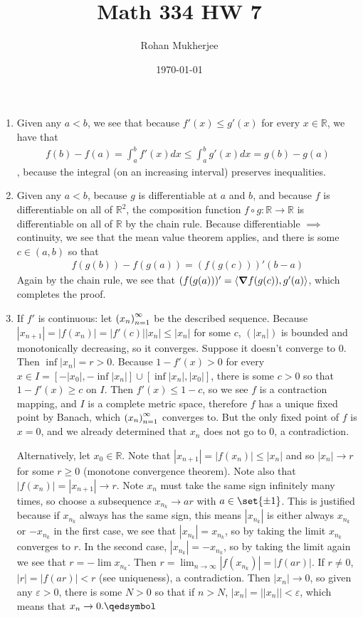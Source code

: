 \documentclass[12pt]{article}
\title{Math 334 HW 7}
\date{\today}
\author{Rohan Mukherjee}
\theoremstyle{definition}
\theoremstyle{remark}
\newcommand{\R}{\mathbb{R}}
\renewcommand{\ip}[2]{\langle #1, #2 \rangle}
\newcommand{\ve}{\varepsilon}
\renewcommand{\qed}{\hfill\qedsymbol}
\newcommand{\seq}[2]{\qty(#1_#2)_{#2=1}^{\infty}}
\begin{document}
	\maketitle
	\begin{enumerate}[leftmargin=\labelsep]
		\item 
		Given any $a < b$, we see that because $f'(x) \leq g'(x)$ for every $x \in \R$, we have that
		\begin{align*}
			f(b)-f(a) = \int_{a}^{b} f'(x)dx \leq \int_{a}^{b} g'(x)dx = g(b)-g(a)
		\end{align*}, because the integral (on an increasing interval) preserves inequalities.
		
		\item 
		Given any $a < b$, because $g$ is differentiable at $a$ and $b$, and because $f$ is differentiable on all of $\R^2$, the composition function $f \circ g: \R \to \R$ is differentiable on all of $\R$ by the chain rule. Because differentiable $\implies$ continuity, we see that the mean value theorem applies, and there is some $c \in (a, b)$ so that 
			\begin{align*}
				f(g(b))-f(g(a)) = (f(g(c)))'(b-a)
			\end{align*}
		Again by the chain rule, we see that $(f(g(a)))' = \ip{\grad{f(g(c))}}{g'(a)}$, which completes the proof.
		
		\item 
		If $f'$ is continuous: let $\seq{x}{n}$ be the described sequence. Because $|x_{n+1}|=|f(x_n)|=|f'(c)||x_n| \leq |x_n|$ for some $c$, $(|x_n|)$ is bounded and monotonically decreasing, so it converges. Suppose it doesn't converge to 0. Then $\inf |x_n| = r > 0$. Because $1 - f'(x) > 0$ for every $x \in I = [-|x_0|, -\inf |x_n|] \cup [\inf |x_n|, |x_0|]$, there is some $c > 0$ so that $1 - f'(x) \geq c$ on $I$. Then $f'(x) \leq 1-c$, so we see $f$ is a contraction mapping, and $I$ is a complete metric space, therefore $f$ has a unique fixed point by Banach, which $\seq{x}{n}$ converges to. But the only fixed point of $f$ is $x=0$, and we already determined that $x_n$ does not go to 0, a contradiction.
		
		Alternatively, let $x_0 \in \R$. Note that $|x_{n+1}| = |f(x_n)|\leq |x_n|$ and so $|x_n| \to r$ for some $r \geq 0$ (monotone convergence theorem). Note also that $|f(x_n)| = |x_{n+1}| \to r$. Note $x_n$ must take the same sign infinitely many times, so choose a subsequence $x_{n_k} \to ar$ with $a \in \set{\pm 1}$. This is justified because if $x_{n_k}$ always has the same sign, this means $|x_{n_k}|$ is either always $x_{n_k}$ or $-x_{n_k}$ in the first case, we see that $|x_{n_k}|=x_{n_k}$, so by taking the limit $x_{n_k}$ converges to $r$. In the second case, $|x_{n_k}| = -x_{n_k}$, so by taking the limit again we see that $r = -\lim x_{n_k}$. Then $r = \lim_{n \to \infty} |f(x_{n_k})| = |f(ar)|$. If $r \neq 0$, $|r|=|f(ar)|<r$ (see uniqueness), a contradiction. Then $|x_n| \to 0$, so given any $\ve > 0$, there is some $N > 0$ so that if $n > N$, $|x_n|=||x_n|| < \ve$, which means that $x_n \to 0. \qed$
		

\end{enumerate}
\end{document}
